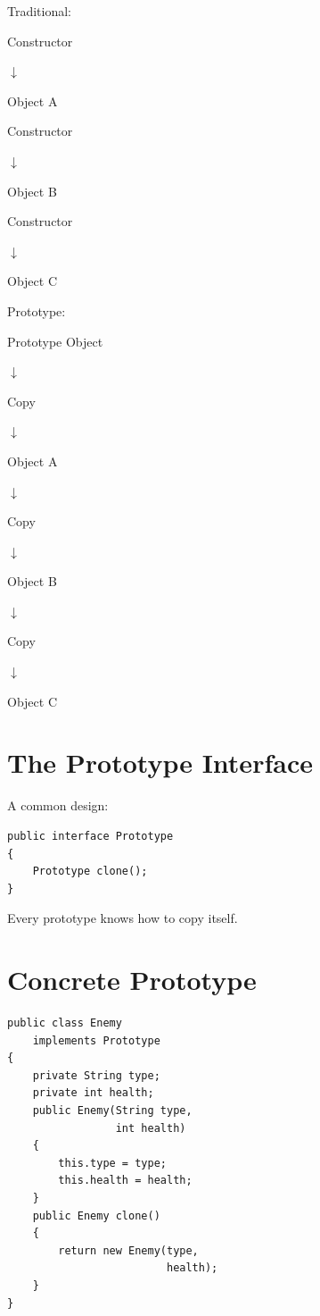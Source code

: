 \documentclass[11pt,a4paper]{book}
\begin{document}
\begin{mentalmodel}

Traditional:

Constructor

$\downarrow$

Object A

Constructor

$\downarrow$

Object B

Constructor

$\downarrow$

Object C

Prototype:

Prototype Object

$\downarrow$

Copy

$\downarrow$

Object A

$\downarrow$

Copy

$\downarrow$

Object B

$\downarrow$

Copy

$\downarrow$

Object C

\end{mentalmodel}


\section{The Prototype Interface}

A common design:

\begin{verbatim}
public interface Prototype
{
    Prototype clone();
}
\end{verbatim}

Every prototype knows how to copy itself.


\section{Concrete Prototype}

\begin{verbatim}
public class Enemy
    implements Prototype
{
    private String type;
    private int health;
    public Enemy(String type,
                 int health)
    {
        this.type = type;
        this.health = health;
    }
    public Enemy clone()
    {
        return new Enemy(type,
                         health);
    }
}
\end{verbatim}
\end{document}

